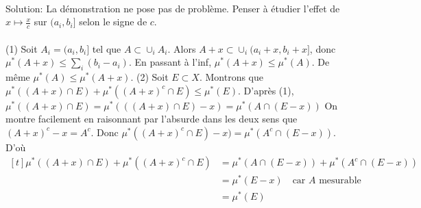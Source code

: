\documentclass{report}
\begin{document}
\subsection{} \\ \\

Solution: La démonstration ne pose pas de problème. Penser à étudier l'effet de $x\mapsto \frac x c$ sur $(a_i,b_i]$ selon le signe de $c$.\newline \newline
{}\\ \\
(1) Soit $A_i=(a_i,b_i]$ tel que $A\subset \cup_i A_i$. Alors $A+x\subset \cup_i (a_i+x,b_i+x]$, donc $\mu^*(A+x)\leq \sum_i (b_i-a_i)$. En passant à l'inf, $\mu^*(A+x)\leq \mu^*(A)$.\newline
De même $\mu^*(A)\leq \mu^*(A+x)$.\newline
(2) Soit $E\subset X$. Montrons que $\mu^*((A+x)\cap E) + \mu^*((A+x)^c\cap E) \leq \mu^*(E)$.\newline
D'après (1), $\mu^*((A+x)\cap E) = \mu^*(((A+x)\cap E)-x) = \mu^*(A\cap (E-x))$\newline
On montre facilement en raisonnant par l'absurde dans les deux sens que\newline  
$(A+x)^c-x = A^c$. \newline
Donc $\mu^*((A+x)^c\cap E)-x) = \mu^*(A^c\cap (E-x))$. \newline
D'où $\begin{aligned}[t] \mu^*((A+x)\cap E) + \mu^*((A+x)^c\cap E) &= \mu^*(A\cap (E-x)) +  \mu^*(A^c\cap (E-x)) \\
&= \mu^*(E-x) \quad \text{car $A$ mesurable}\\
&= \mu^*(E)  \end{aligned}$
\\
\end{document}
